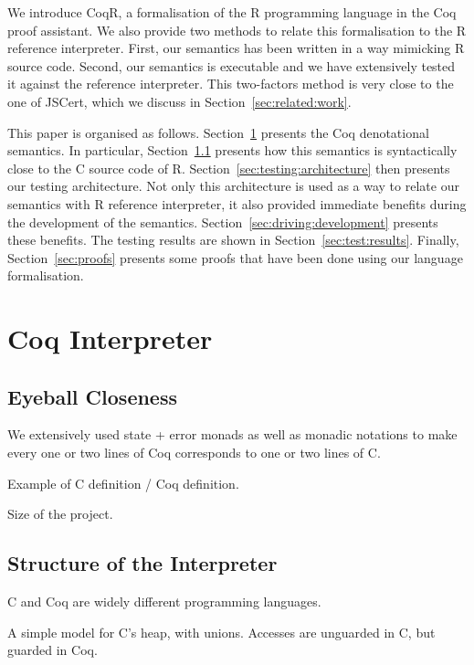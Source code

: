 \documentclass[
    sigplan,
    10pt,
    review, %
    natbib=false %
 ]{acmart}
\newcommand{\mb}[1]{\todo[color=purple!20,size=\scriptsize]{#1}}
\begin{document}
We introduce CoqR\mb{Are we fixed on the name? ☺},
a formalisation of the R programming language in the Coq proof assistant.
We also provide two methods to relate this formalisation
to the R reference interpreter.
First, our semantics has been written in a way mimicking R source code.
Second, our semantics is executable and we have extensively tested it
against the reference interpreter.
%
This two-factors method is very close to the one of JSCert,
which we discuss in Section~\ref{sec:related:work}.

This paper is organised as follows.
Section~\ref{sec:coq:interp} presents the Coq denotational semantics.
In particular, Section~\ref{sec:eyeball:closeness} presents
how this semantics is syntactically close to the C source code of R.
Section~\ref{sec:testing:architecture} then presents our testing architecture.
Not only this architecture is used as a way to relate our semantics
with R reference interpreter,
it also provided immediate benefits during the development of the semantics.
Section~\ref{sec:driving:development} presents these benefits.
The testing results are shown in Section~\ref{sec:test:results}.
Finally, Section~\ref{sec:proofs} presents some proofs that have been done
using our language formalisation.

\section{Coq Interpreter}
\label{sec:coq:interp}

\subsection{Eyeball Closeness}
\label{sec:eyeball:closeness}

We extensively used state + error monads as well as monadic notations
to make every one or two lines of Coq corresponds to one or two lines of C.

Example of C definition / Coq definition.

Size of the project.

\subsection{Structure of the Interpreter}
\label{sec:coq:structure}

C and Coq are widely different programming languages.

A simple model for C’s heap, with unions.
Accesses are unguarded in C, but guarded in Coq.
\end{document}
